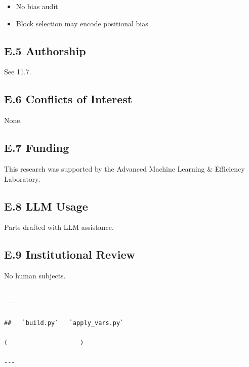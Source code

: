 \begin{itemize}
\item No bias audit
\item Block selection may encode positional bias

\end{itemize}
\subsection{E.5 Authorship}

See  11.7.

\subsection{E.6 Conflicts of Interest}

None.

\subsection{E.7 Funding}

This research was supported by the Advanced Machine Learning \& Efficiency Laboratory.

\subsection{E.8 LLM Usage}

Parts drafted with LLM assistance.

\subsection{E.9 Institutional Review}

No human subjects.
\begin{lstlisting}

---

##   `build.py`   `apply_vars.py`

(                    )

---
\end{lstlisting}